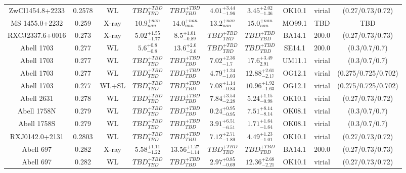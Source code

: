 \begin{table}
\begin{tabular}{cccccccccc}
ZwCl1454.8+2233 & 0.2578 & WL & ${TBD}^{+TBD}_{TBD}$ & ${TBD}^{+TBD}_{TBD}$ & ${4.01}^{+3.44}_{-1.96}$ & ${3.45}^{+2.02}_{-1.36}$ & OK10.1 & virial & (0.27/0.73/0.72) \\
MS 1455.0+2232 & 0.259 & X-ray & ${10.9}^{+nan}_{nan}$ & ${14.0}^{+nan}_{nan}$ & ${13.2}^{+nan}_{nan}$ & ${15.0}^{+nan}_{nan}$ & MO99.1 & TBD & TBD \\
RXCJ2337.6+0016 & 0.273 & X-ray & ${5.02}^{+1.55}_{-1.77}$ & ${8.5}^{+1.01}_{-0.89}$ & ${TBD}^{+TBD}_{TBD}$ & ${TBD}^{+TBD}_{TBD}$ & BA14.1 & 200.0 & (0.27/0.73/0.73) \\
Abell 1703 & 0.277 & WL & ${5.6}^{+0.8}_{-0.8}$ & ${13.6}^{+2.0}_{-2.0}$ & ${TBD}^{+TBD}_{TBD}$ & ${TBD}^{+TBD}_{TBD}$ & SE14.1 & 200.0 & (0.3/0.7/0.7) \\
Abell 1703 & 0.277 & WL & ${TBD}^{+TBD}_{TBD}$ & ${TBD}^{+TBD}_{TBD}$ & ${7.02}^{+2.36}_{-1.7}$ & ${17.6}^{+3.49}_{2.91}$ & UM11.1 & virial & (0.3/0.7/0.7) \\
Abell 1703 & 0.277 & WL & ${TBD}^{+TBD}_{TBD}$ & ${TBD}^{+TBD}_{TBD}$ & ${4.79}^{+1.24}_{-1.03}$ & ${12.88}^{+2.61}_{-2.17}$ & OG12.1 & virial & (0.275/0.725/0.702) \\
Abell 1703 & 0.277 & WL+SL & ${TBD}^{+TBD}_{TBD}$ & ${TBD}^{+TBD}_{TBD}$ & ${7.08}^{+1.14}_{-0.84}$ & ${10.96}^{+1.92}_{-1.63}$ & OG12.1 & virial & (0.275/0.725/0.702) \\
Abell 2631 & 0.278 & WL & ${TBD}^{+TBD}_{TBD}$ & ${TBD}^{+TBD}_{TBD}$ & ${7.84}^{+3.54}_{-2.28}$ & ${5.24}^{+1.15}_{-0.98}$ & OK10.1 & virial & (0.27/0.73/0.72) \\
Abell 1758N & 0.279 & WL & ${TBD}^{+TBD}_{TBD}$ & ${TBD}^{+TBD}_{TBD}$ & ${0.24}^{+0.95}_{-0.95}$ & ${7.51}^{+8.14}_{-8.14}$ & OK08.1 & virial & (0.3/0.7/0.7) \\
Abell 1758S & 0.279 & WL & ${TBD}^{+TBD}_{TBD}$ & ${TBD}^{+TBD}_{TBD}$ & ${3.91}^{+6.51}_{-6.51}$ & ${1.71}^{+1.64}_{-1.64}$ & OK08.1 & virial & (0.3/0.7/0.7) \\
RXJ0142.0+2131 & 0.2803 & WL & ${TBD}^{+TBD}_{TBD}$ & ${TBD}^{+TBD}_{TBD}$ & ${7.12}^{+2.71}_{-1.89}$ & ${4.49}^{+1.23}_{-1.01}$ & OK10.1 & virial & (0.27/0.73/0.72) \\
Abell 697 & 0.282 & X-ray & ${5.58}^{+1.11}_{-1.22}$ & ${13.56}^{+1.27}_{-1.14}$ & ${TBD}^{+TBD}_{TBD}$ & ${TBD}^{+TBD}_{TBD}$ & BA14.1 & 200.0 & (0.27/0.73/0.73) \\
Abell 697 & 0.282 & WL & ${TBD}^{+TBD}_{TBD}$ & ${TBD}^{+TBD}_{TBD}$ & ${2.97}^{+0.85}_{-0.69}$ & ${12.36}^{+2.68}_{-2.21}$ & OK10.1 & virial & (0.27/0.73/0.72) \\

\end{tabular}
\end{table}
